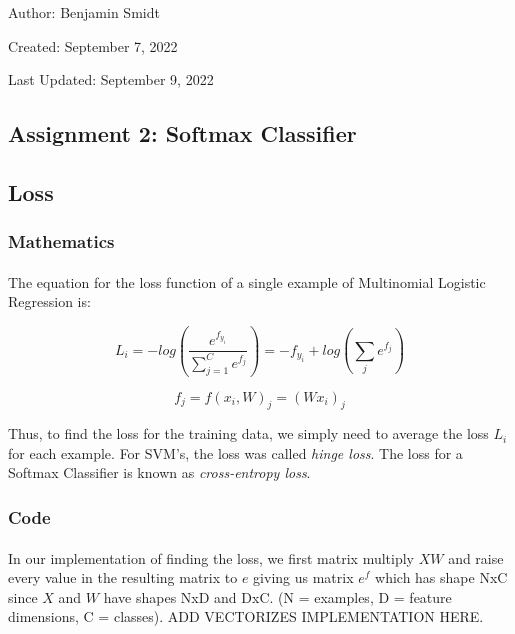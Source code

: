 \documentclass[12pt]{article}
\begin{document}
\noindent Author: Benjamin Smidt

\noindent Created: September 7, 2022

\noindent Last Updated: September 9, 2022
\begin{center}
\section*{Assignment 2: Softmax Classifier}
\end{center}

\subsection*{Loss}
\subsubsection{Mathematics}

\paragraph{}
The equation for the loss function of a single example of 
Multinomial Logistic Regression is:  

\begin{equation}
    L_{i} = -log(\frac{e^{f_{y_{i}}}}{\sum_{j=1}^C e^{f_j}}) 
    = -f_{y_{i}} + log(\sum_{j} e^{f_{j}})
\end{equation}

\begin{equation}
    f_j = f(x_{i}, W)_j = (Wx_{i})_j
\end{equation}

\noindent Thus, to find the loss for the training data, we simply need 
to average the loss $L_{i}$ for each example. For SVM's, the loss was 
called \emph{hinge loss}. The loss for a Softmax Classifier is known as 
\emph{cross-entropy loss}. 

\subsubsection{Code}
\paragraph{} 
In our implementation of finding the loss, we first matrix 
multiply $XW$ and raise every value in the resulting matrix to $e$
giving us matrix $e^{f}$ which has shape NxC since $X$ and $W$ 
have shapes NxD and DxC.
(N = examples, D = feature dimensions, C = classes). ADD VECTORIZES IMPLEMENTATION HERE.
\end{document}
